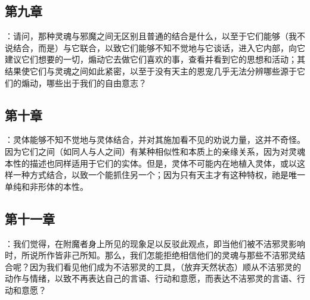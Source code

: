 \subsection{第九章}

\par

：请问，那种灵魂与邪魔之间无区别且普通的结合是什么，以至于它们能够（我不说结合，而是）与它联合，以致它们能够不知不觉地与它谈话，进入它内部，向它建议它们想要的一切，煽动它去做它们喜欢的事，查看并看到它的思想和活动；其结果使它们与灵魂之间如此紧密，以至于没有天主的恩宠几乎无法分辨哪些源于它们的煽动，哪些出于我们的自由意志？\par


\subsection{第十章}

\par

：灵体能够不知不觉地与灵体结合，并对其施加看不见的劝说力量，这并不奇怪。因为它们之间（如同人与人之间）有某种相似性和本质上的亲缘关系，因为对灵魂本性的描述也同样适用于它们的实体。但是，灵体不可能内在地植入灵体，或以这样一种方式结合，以致一个能抓住另一个；因为只有天主才有这种特权，祂是唯一单纯和非形体的本性。\par


\subsection{第十一章}

\par

：我们觉得，在附魔者身上所见的现象足以反驳此观点，即当他们被不洁邪灵影响时，所说所作皆非己所知。那么，我们怎能拒绝相信他们的灵魂与那些不洁邪灵结合呢？因为我们看见他们成为不洁邪灵的工具，（放弃天然状态）顺从不洁邪灵的动作与情绪，以致不再表达自己的言语、行动和意愿，而表达不洁邪灵的言语、行动和意愿？\par


